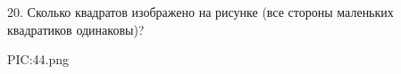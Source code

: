 20. Сколько квадратов изображено на рисунке (все стороны маленьких квадратиков одинаковы)?
\begin{center}
{{PIC:44.png}}
\end{center}
